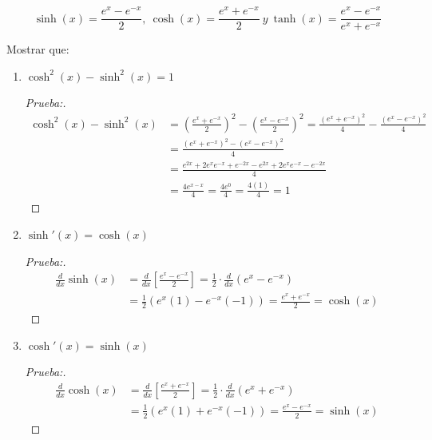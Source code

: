 \documentclass[12pt]{article}
\begin{document}
\begin{equation*}
    \sinh(x)=\frac{e^x-e^{-x}}{2}, \ \cosh(x)=\frac{e^x+e^{-x}}{2} \ y \ \tanh(x)=\frac{e^x-e^{-x}}{e^x+e^{-x}}
\end{equation*}

Mostrar que:

\begin{enumerate}[\hspace{9px} a)]
    \item \(\cosh^2(x)-\sinh^2(x)=1\)
    
        \begin{proof}[Prueba:]
            \begin{align*}
                \cosh^2(x)-\sinh^2(x) &= \left(\frac{e^x+e^{-x}}{2}\right)^2-\left(\frac{e^x-e^{-x}}{2}\right)^2 = \frac{(e^x+e^{-x})^2}{4} - \frac{(e^x-e^{-x})^2}{4}\\
                &= \frac{(e^x+e^{-x})^2-(e^x-e^{-x})^2}{4} \\
                &= \frac{e^{2x}+2e^xe^{-x}+e^{-2x}-e^{2x}+2e^xe^{-x}-e^{-2x}}{4}\\
                &= \frac{4e^{x-x}}{4} = \frac{4e^0}{4} = \frac{4(1)}{4} = 1
            \end{align*}
        \end{proof}

    \item \(\sinh'(x)=\cosh(x)\)
    
        \begin{proof}[Prueba:]
            \begin{align*}
                \frac{d}{dx}\sinh(x) &= \frac{d}{dx}\left[\frac{e^x-e^{-x}}{2}\right] = \frac{1}{2}\cdot\frac{d}{dx}(e^x-e^{-x})\\
                &= \frac{1}{2}(e^x(1)-e^{-x}(-1)) = \frac{e^x+e^{-x}}{2} = \cosh(x)
            \end{align*}
        \end{proof}

    \item \(\cosh'(x)=\sinh(x)\) 
    
        \begin{proof}[Prueba:]
            \begin{align*}
                \frac{d}{dx}\cosh(x) &= \frac{d}{dx}\left[\frac{e^x+e^{-x}}{2}\right] = \frac{1}{2}\cdot\frac{d}{dx}(e^x+e^{-x})\\
                &= \frac{1}{2}(e^x(1)+e^{-x}(-1)) = \frac{e^x-e^{-x}}{2} = \sinh(x)
            \end{align*}
        \end{proof}


\end{enumerate}
\end{document}
